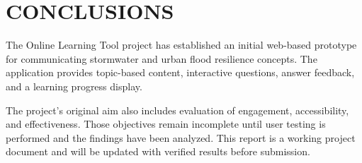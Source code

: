 \chapter{CONCLUSIONS}
The Online Learning Tool project has established an initial web-based prototype for communicating stormwater and urban flood resilience concepts. The application provides topic-based content, interactive questions, answer feedback, and a learning progress display.

The project's original aim also includes evaluation of engagement, accessibility, and effectiveness. Those objectives remain incomplete until user testing is performed and the findings have been analyzed. This report is a working project document and will be updated with verified results before submission.

